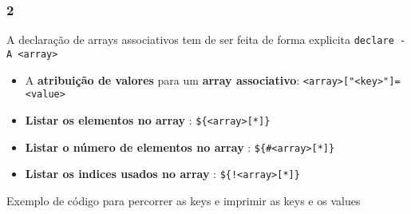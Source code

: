 \documentclass[]{article}
\newenvironment{Shaded}{}{}
\newcommand{\KeywordTok}[1]{\textcolor[rgb]{0.00,0.44,0.13}{\textbf{{#1}}}}
\newcommand{\DataTypeTok}[1]{\textcolor[rgb]{0.56,0.13,0.00}{{#1}}}
\newcommand{\StringTok}[1]{\textcolor[rgb]{0.25,0.44,0.63}{{#1}}}
\newcommand{\OtherTok}[1]{\textcolor[rgb]{0.00,0.44,0.13}{{#1}}}
\newcommand{\NormalTok}[1]{{#1}}
\begin{document}
\subsubsection{2}\label{section-23}

A declaração de arrays associativos tem de ser feita de forma explicita
\texttt{declare -A \textless{}array\textgreater{}}

\begin{itemize}
\itemsep1pt\parskip0pt
\item
  A \textbf{atribuição de valores} para um \textbf{array associativo}:
  \texttt{\textless{}array\textgreater{}{[}"\textless{}key\textgreater{}"{]}=\textless{}value\textgreater{}}
\item
  \textbf{Listar os elementos no array} :
  \texttt{\$\{\textless{}array\textgreater{}{[}*{]}\}}
\item
  \textbf{Listar o número de elementos no array} :
  \texttt{\$\{\#\textless{}array\textgreater{}{[}*{]}\}}
\item
  \textbf{Listar os indices usados no array} :
  \texttt{\$\{!\textless{}array\textgreater{}{[}*{]}\}}
\end{itemize}

Exemplo de código para percorrer as keys e imprimir as keys e os values

\begin{Shaded}
\end{Shaded}
\end{document}
